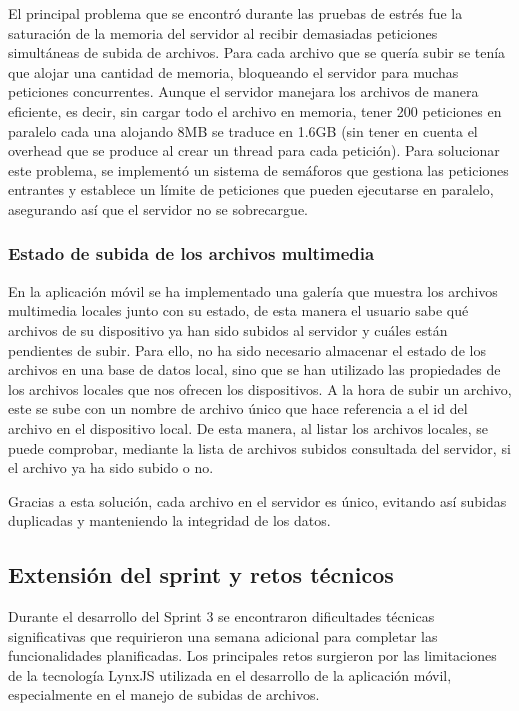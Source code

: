El principal problema que se encontró durante las pruebas de estrés fue la saturación de la memoria del servidor al recibir demasiadas peticiones simultáneas de subida de archivos. Para cada archivo que se quería subir se tenía que alojar una cantidad de memoria, bloqueando el servidor para muchas peticiones concurrentes. Aunque el servidor manejara los archivos de manera eficiente, es decir, sin cargar todo el archivo en memoria, tener 200 peticiones en paralelo cada una alojando 8MB se traduce en 1.6GB (sin tener en cuenta el overhead que se produce al crear un thread para cada petición). Para solucionar este problema, se implementó un sistema de semáforos que gestiona las peticiones entrantes y establece un límite de peticiones que pueden ejecutarse en paralelo, asegurando así que el servidor no se sobrecargue.

\subsubsection{Estado de subida de los archivos multimedia}
En la aplicación móvil se ha implementado una galería que muestra los archivos multimedia locales junto con su estado, de esta manera el usuario sabe qué archivos de su dispositivo ya han sido subidos al servidor y cuáles están pendientes de subir.
Para ello, no ha sido necesario almacenar el estado de los archivos en una base de datos local, sino que se han utilizado las propiedades de los archivos locales que nos ofrecen los dispositivos. A la hora de subir un archivo, este se sube con un nombre de archivo único que hace referencia a el id del archivo en el dispositivo local. De esta manera, al listar los archivos locales, se puede comprobar, mediante la lista de archivos subidos consultada del servidor, si el archivo ya ha sido subido o no.

Gracias a esta solución, cada archivo en el servidor es único, evitando así subidas duplicadas y manteniendo la integridad de los datos.

\subsection{Extensión del sprint y retos técnicos}

Durante el desarrollo del Sprint 3 se encontraron dificultades técnicas significativas que requirieron una semana adicional para completar las funcionalidades planificadas. Los principales retos surgieron por las limitaciones de la tecnología LynxJS utilizada en el desarrollo de la aplicación móvil, especialmente en el manejo de subidas de archivos.

